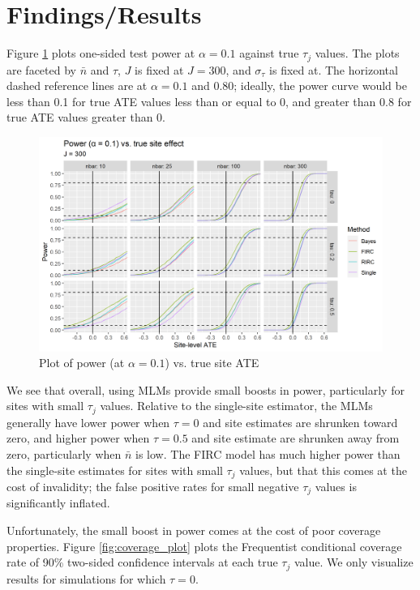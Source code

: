 \documentclass[]{article}
\begin{document}
\section{Findings/Results}

Figure \ref{fig:power_plot} plots one-sided test power at $\alpha=0.1$ against true $\tau_j$ values.
The plots are faceted by $\bar{n}$ and $\tau$, $J$ is fixed at $J=300$, and $\sigma_\tau$ is fixed at.
The horizontal dashed reference lines are at $\alpha = 0.1$ and $0.80$; ideally, the power curve would be less than 0.1 for true ATE values less than or equal to 0, and greater than 0.8 for true ATE values greater than 0.

\begin{figure}[ht]
	\centering
	\includegraphics[width=\textwidth]{power_plot_J300}
	\caption{Plot of power (at $\alpha = 0.1$) vs. true site ATE}
	\label{fig:power_plot}
\end{figure}

We see that overall, using MLMs provide small boosts in power, particularly for sites with small $\tau_j$ values.
Relative to the single-site estimator, the MLMs generally have lower power when $\tau=0$ and site estimates are shrunken toward zero, and higher power when $\tau=0.5$ and site estimate are shrunken away from zero, particularly when $\bar{n}$ is low.
The FIRC model has much higher power than the single-site estimates for sites with small $\tau_j$ values, but that this comes at the cost of invalidity; the false positive rates for small negative $\tau_j$ values is significantly inflated.

Unfortunately, the small boost in power comes at the cost of poor coverage properties.
Figure \ref{fig:coverage_plot} plots the Frequentist conditional coverage rate of 90\% two-sided confidence intervals at each true $\tau_j$ value.
We only visualize results for simulations for which $\tau = 0$.
\end{document}
